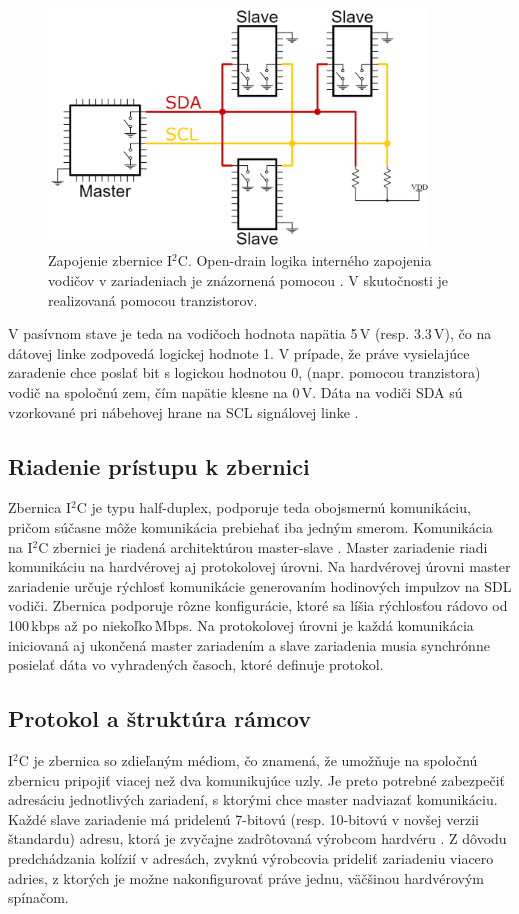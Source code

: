 \begin{figure}
    \centerline{\includegraphics[width=0.9\textwidth]{images/i2cWiring.png}}
    \caption[Zapojenie zbernice I$^2$C]{Zapojenie zbernice I$^2$C. Open-drain logika interného zapojenia vodičov v zariadeniach je znázornená pomocou . V skutočnosti je realizovaná pomocou tranzistorov.}
    \label{obr:i2cWiring}
\end{figure}

V pasívnom stave je teda na vodičoch hodnota napätia 5\,V (resp. 3.3\,V), čo na dátovej linke zodpovedá logickej hodnote 1. V prípade, že práve vysielajúce zaradenie chce poslať bit s logickou hodnotou 0,  (napr. pomocou tranzistora) vodič na spoločnú zem, čím napätie klesne na 0\,V. Dáta na vodiči SDA sú vzorkované pri nábehovej hrane na SCL signálovej linke \cite{i2cSpec}.

\subsection{Riadenie prístupu k zbernici}
Zbernica I$^2$C je typu half-duplex, podporuje teda obojsmernú komunikáciu, pričom súčasne môže komunikácia prebiehať iba jedným smerom. Komunikácia na I$^2$C zbernici je riadená architektúrou master-slave \cite{i2cSpec}. Master zariadenie riadi komunikáciu na hardvérovej aj protokolovej úrovni. Na hardvérovej úrovni master zariadenie určuje rýchlosť komunikácie generovaním hodinových impulzov na SDL vodiči. Zbernica podporuje rôzne konfigurácie, ktoré sa líšia rýchlosťou rádovo od 100\,kbps až po niekoľko\,Mbps. Na protokolovej úrovni je každá komunikácia iniciovaná aj ukončená master zariadením a slave zariadenia musia synchrónne posielať dáta vo vyhradených časoch, ktoré definuje protokol.

\subsection{Protokol a štruktúra rámcov}
I$^2$C je zbernica so zdieľaným médiom, čo znamená, že umožňuje na spoločnú zbernicu pripojiť viacej než dva komunikujúce uzly. Je preto potrebné zabezpečiť adresáciu jednotlivých zariadení, s ktorými chce master nadviazať komunikáciu. Každé slave zariadenie má pridelenú 7-bitovú (resp. 10-bitovú v novšej verzii štandardu) adresu, ktorá je zvyčajne zadrôtovaná výrobcom hardvéru \cite{i2cSpec}. Z dôvodu predchádzania kolízií v adresách, zvyknú výrobcovia prideliť zariadeniu viacero adries, z ktorých je možne nakonfigurovať práve jednu, väčšinou hardvérovým spínačom.

